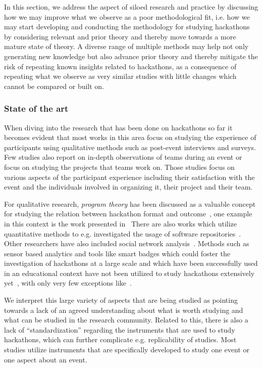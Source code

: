 \documentclass{ieeeaccess}
\begin{document}
In this section, we address the aspect of siloed research and practice by discussing how we may improve what we observe as a poor methodological fit, i.e. how we may start developing and conducting the methodology for studying hackathons by considering relevant and prior theory and thereby move towards a more mature state of theory.
A diverse range of multiple methods may help not only generating new knowledge but also advance prior theory and thereby mitigate the risk of repeating known insights related to hackathons, as a consequence of repeating what we observe as very similar studies with little changes which cannot be compared or built on.

\subsubsection{State of the art}
When diving into the research that has been done on hackathons so far it becomes evident that most works in this area focus on studying the experience of participants using qualitative methods such as post-event interviews and surveys.
Few studies also report on in-depth observations of teams during an event or focus on studying the projects that teams work on. 
Those studies focus on various aspects of the participant experience including their satisfaction with the event and the individuals involved in organizing it, their project and their team.

For qualitative research, \textit{program theory} has been discussed as a valuable concept for studying the relation between hackathon format and outcome~\cite{falk202010}, one example in this context is the work presented in~\cite{falk2021hackathons}
There are also works which utilize quantitative methods to e.g. investigated the usage of software repositories~\cite{mcintosh2021hackathon,nolte2020happens,mahmoud2022one}. 
Other researchers have also included social network analysis~\cite{gabrilove20193144}. 
Methods such as sensor based analytics and tools like smart badges which could foster the investigation of hackathons at a large scale and which have been successfully used in an educational context have not been utilized to study hackathons extensively yet~\cite{ouhaichi2021mbox}, with only very few exceptions like~\cite{lederman2015hacking}. 

We interpret this large variety of aspects that are being studied as pointing towards a lack of an agreed understanding about what is worth studying and what can be studied in the research community. 
Related to this, there is also a lack of “standardization” regarding the instruments that are used to study hackathons, which can further complicate e.g. replicability of studies.  
Most studies utilize instruments that are specifically developed to study one event or one aspect about an event.
\end{document}
